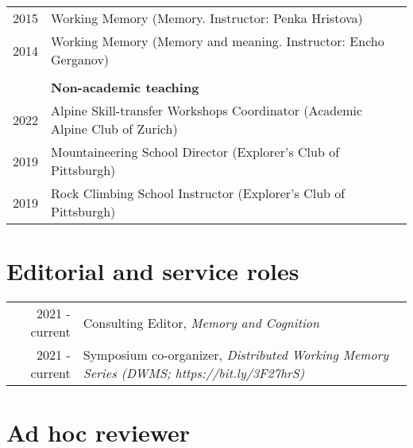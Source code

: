 \documentclass[letterpaper]{article}
\begin{document}
\begin{longtable}{rl}
2015 & Working Memory (Memory. Instructor: Penka Hristova)\\
2014 & Working Memory (Memory and meaning. Instructor: Encho Gerganov)\\
&\\
& \textbf{Non-academic teaching}\\[6pt]
2022 & Alpine Skill-transfer Workshops Coordinator (Academic Alpine Club of Zurich)\\
2019 & Mountaineering School Director (Explorer's Club of Pittsburgh)\\
2019 & Rock Climbing School Instructor (Explorer's Club of Pittsburgh)\\


\end{longtable}

\section*{Editorial and service roles}

\begin{tabular}{rl}
	2021 - current & Consulting Editor, {\it Memory and Cognition}\\
	2021 - current & Symposium co-organizer, {\it Distributed Working Memory Series (DWMS; https://bit.ly/3F27hrS)}
\end{tabular}

\section*{Ad hoc reviewer}
\end{document}
